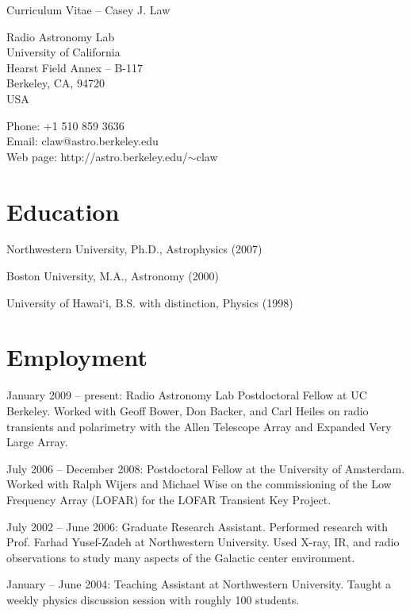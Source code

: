 \documentclass[12pt]{article}
\begin{document}
\begin{center}
\Large{Curriculum Vitae -- Casey J. Law}
\end{center}

\begin{flushright}
Radio Astronomy Lab \\
University of California \\
Hearst Field Annex -- B-117 \\
Berkeley, CA, 94720 \\
USA
\end{flushright}

\begin{flushright}
Phone:  +1 510 859 3636 \\
Email:  claw@astro.berkeley.edu \\
Web page: http://astro.berkeley.edu/$\sim$claw
\end{flushright}

\section{Education}
\indent 

Northwestern University, Ph.D., Astrophysics (2007)

Boston University, M.A., Astronomy (2000)

University of Hawai`i, B.S. with distinction, Physics (1998)

\section{Employment}
\indent

January 2009 -- present:  Radio Astronomy Lab Postdoctoral Fellow at UC Berkeley.  Worked with Geoff Bower, Don Backer, and Carl Heiles on radio transients and polarimetry with the Allen Telescope Array and Expanded Very Large Array.

July 2006 -- December 2008: Postdoctoral Fellow at the University of Amsterdam.  Worked with Ralph Wijers and Michael Wise on the commissioning of the Low Frequency Array (LOFAR) for the LOFAR Transient Key Project.

July 2002 -- June 2006:  Graduate Research Assistant.  Performed research with Prof. Farhad Yusef-Zadeh at Northwestern University.  Used X-ray, IR, and radio observations to study many aspects of the Galactic center environment.

January -- June 2004:  Teaching Assistant at Northwestern University.  Taught a weekly physics discussion session with roughly 100 students.
\end{document}

